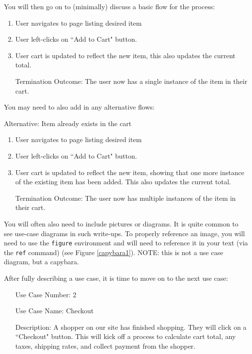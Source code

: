 \documentclass[10pt,conference,onecolumn,compsoc]{IEEEtran}
\begin{document}
You will then go on to (minimally) discuss a basic flow for the process:

\begin{enumerate}
\item User navigates to page listing desired item
\item User left-clicks on ``Add to Cart" button.
\item User cart is updated to reflect the new item, this also updates the current total.
\item[Termination Outcome:] The user now has a single instance of the item in their cart.
\end{enumerate}

You may need to also add in any alternative flows:

Alternative: Item already exists in the cart
\begin{enumerate}
\item User navigates to page listing desired item
\item User left-clicks on ``Add to Cart" button.
\item User cart is updated to reflect the new item, showing that one more instance of the existing item has been added.  This also updates the current total.
\item[Termination Outcome:] The user now has multiple instances of the item in their cart.
\end{enumerate}

You will often also need to include pictures or diagrams.  It is quite common to see use-case diagrams in such write-ups.  To properly reference an image, you will need to use the \texttt{figure} environment and will need to reference it in your text (via the \texttt{ref} command) (see Figure \ref{capybara1}).  NOTE: this is not a use case diagram, but a capybara.

After fully describing a use case, it is time to move on to the next use case:

\begin{itemize}
\item[Use Case Number:] 2
\item[Use Case Name:] Checkout
\item[Description:] A shopper on our site has finished shopping.  They will click on a ``Checkout" button.  This will kick off a process to calculate cart total, any taxes, shipping rates, and collect payment from the shopper.

\end{itemize}
\end{document}
